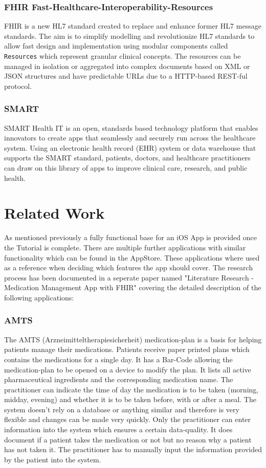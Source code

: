 \documentclass{article}
\begin{document}
\section{FHIR Fast-Healthcare-Interoperability-Resources}
FHIR \citep{fhir} is a new HL7 standard created to replace and enhance former HL7 message standards. The aim is to simplify modelling and revolutionize HL7 standards to allow fast design and implementation using modular components called \texttt{Resources} which represent granular clinical concepts. The resources can be managed in isolation or aggregated into complex documents based on XML or JSON structures and have predictable URLs due to a HTTP-based REST-ful protocol. \citep{fhir-wiki}

\section{SMART}
SMART Health IT is an open, standards based technology platform that enables innovators to create apps that seamlessly and securely run across the healthcare system. Using an electronic health record (EHR) system or data warehouse that supports the SMART standard, patients, doctors, and healthcare practitioners can draw on this library of apps to improve clinical care, research, and public health. \citep{smart}

\part{Related Work}
As mentioned previously a fully functional base for an iOS App is provided once the Tutorial is complete. There are multiple further applications with similar functionality which can be found in the AppStore. These applications where used as a reference when deciding which features the app should cover. The research process has been documented in a seperate paper named "Literature Research - Medication Management App with FHIR" covering the detailed description of the following applications:

\section{AMTS}
The AMTS\citep{amts} (Arzneimitteltherapiesicherheit) medication-plan is a basis for helping patients manage their medications. Patients receive paper printed plans which contains the medications for a single day. It has a Bar-Code allowing the medication-plan to be opened on a device to modify the plan.
It lists all active pharmaceutical ingredients and the corresponding medication name. The practitioner can indicate the time of day the medication is to be taken (morning, midday, evening) and whether it is to be taken before, with or after a meal.
The system doesn’t rely on a database or anything similar and therefore is very flexible and changes can be made very quickly. Only the practitioner can enter information into the system which ensures a certain data-quality.
It does document if a patient takes the medication or not but no reason why a patient has not taken it. The practitioner has to manually input the information provided by the patient into the system.
\end{document}
